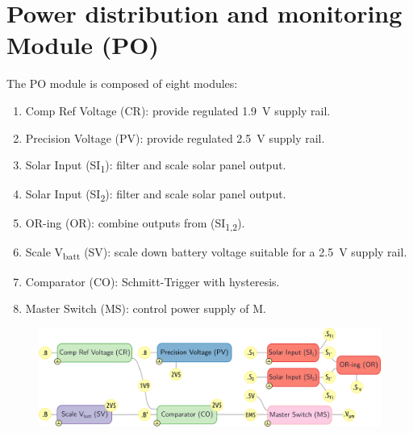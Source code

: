 \section{Power distribution and monitoring Module (PO)}

The PO module is composed of eight modules:

\begin{enumerate}
    \item Comp Ref Voltage (CR): provide regulated \SI{1.9}{\volt} supply rail.
    \item Precision Voltage (PV): provide regulated \SI{2.5}{\volt} supply rail.
    \item Solar Input (SI\textsubscript{1}): filter and scale solar panel output.
    \item Solar Input (SI\textsubscript{2}): filter and scale solar panel output.
    \item OR-ing (OR): combine outputs from (SI\textsubscript{1,2}).
    \item Scale V\textsubscript{batt} (SV): scale down battery voltage suitable for a \SI{2.5}{\volt} supply rail.
    \item Comparator (CO): Schmitt-Trigger with hysteresis.
    \item Master Switch (MS): control power supply of \mu M.
\end{enumerate}

\begin{figure}[h]
    \centering
    \includegraphics[width=1.0\textwidth]{PO/PO}
\end{figure}


\clearpage




\clearpage

\clearpage

\clearpage


\clearpage












